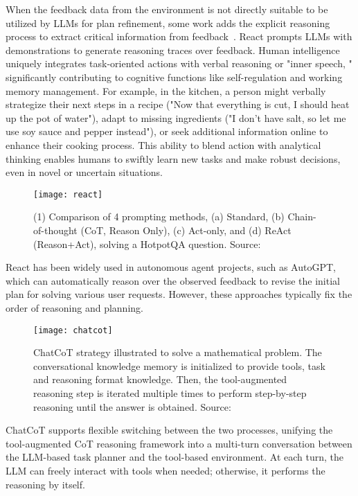 When the feedback data from the environment is not directly suitable to be utilized by LLMs for plan refinement, some work adds the explicit reasoning process to extract critical information from feedback~\cite{chen2023chatcot, yao2022react}.
React prompts LLMs with demonstrations to generate reasoning traces over feedback.
Human intelligence uniquely integrates task-oriented actions with verbal reasoning or "inner speech, " significantly contributing to cognitive functions like self-regulation and working memory management.
For example, in the kitchen, a person might verbally strategize their next steps in a recipe ("Now that everything is cut, I should heat up the pot of
water"), adapt to missing ingredients ("I don’t have salt, so let me use soy sauce and pepper instead"), or seek additional information online to enhance their cooking process.
This ability to blend action with analytical thinking enables humans to swiftly learn new tasks and make robust decisions, even in novel or uncertain situations.
\begin{figure}[h!]
	\centering
	\texttt{[image: react]}
	\caption{(1) Comparison of 4 prompting methods, (a) Standard, (b) Chain-of-thought (CoT, Reason Only), (c) Act-only, and (d) ReAct (Reason+Act), solving a HotpotQA \cite{yang2018hotpotqa} question. Source: \textcite{chen2023chatcot}}
	\label{fig:react}
\end{figure}
React has been widely used in autonomous agent projects, such as AutoGPT, which can automatically reason over the observed feedback to revise the initial plan for solving various user requests.
However, these approaches typically fix the order of reasoning and planning.
\begin{figure}[h!]
	\centering
	\texttt{[image: chatcot]}
	\caption{ChatCoT strategy illustrated to solve a mathematical problem. The conversational knowledge memory is initialized to provide tools, task and reasoning format knowledge. Then, the tool-augmented reasoning step is iterated multiple times to perform step-by-step reasoning until the answer is obtained. Source: \textcite{chen2023chatcot}}
	\label{fig:chatcot}
\end{figure}

ChatCoT supports flexible switching between the two processes, unifying the tool-augmented CoT reasoning framework into a multi-turn conversation between the LLM-based task planner and the tool-based environment.
At each turn, the LLM can freely interact with tools when needed; otherwise, it performs the reasoning by itself.

